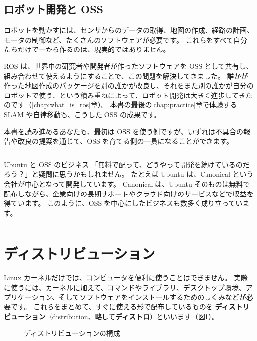 \subsection{ロボット開発と OSS}

ロボットを動かすには、センサからのデータの取得、地図の作成、経路の計画、モータの制御など、たくさんのソフトウェアが必要です。
これらをすべて自分たちだけで一から作るのは、現実的ではありません。

ROS は、世界中の研究者や開発者が作ったソフトウェアを OSS として共有し、組み合わせて使えるようにすることで、この問題を解決してきました。
誰かが作った地図作成のパッケージを別の誰かが改良し、それをまた別の誰かが自分のロボットで使う、という積み重ねによって、ロボット開発は大きく進歩してきたのです（\ref{chap:what_is_ros}章）。
本書の最後の\ref{chap:practice}章で体験する SLAM や自律移動も、こうした OSS の成果です。

本書を読み進めるあなたも、最初は OSS を使う側ですが、いずれは不具合の報告や改良の提案を通じて、OSS を育てる側の一員になることができます。

\begin{column}{Ubuntu と OSS のビジネス}
  「無料で配って、どうやって開発を続けているのだろう？」と疑問に思うかもしれません。
  たとえば Ubuntu は、Canonical という会社が中心となって開発しています。
  Canonical は、Ubuntu そのものは無料で配布しながら、企業向けの長期サポートやクラウド向けのサービスなどで収益を得ています。
  このように、OSS を中心にしたビジネスも数多く成り立っています。
\end{column}

\section{ディストリビューション}
\label{sec:linux-distribution}

Linux カーネルだけでは、コンピュータを便利に使うことはできません。
実際に使うには、カーネルに加えて、コマンドやライブラリ、デスクトップ環境、アプリケーション、そしてソフトウェアをインストールするためのしくみなどが必要です。
これらをまとめて、すぐに使える形で配布しているものを \textbf{ディストリビューション}（distribution、略して\textbf{ディストロ}）といいます（図\ref{fig:linux-distribution}）。

\begin{figure}[tb]
  \centering
  
  \caption{ディストリビューションの構成}
  \label{fig:linux-distribution}
\end{figure}

